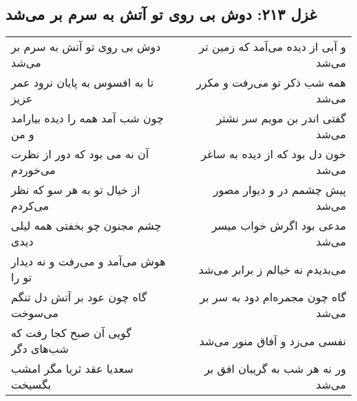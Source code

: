 \begin{center}
\section*{غزل ۲۱۳: دوش بی روی تو آتش به سرم بر می‌شد}
\label{sec:213}
\begin{longtable}{l p{0.5cm} r}
دوش بی روی تو آتش به سرم بر می‌شد
&&
و آبی از دیده می‌آمد که زمین تر می‌شد
\\
تا به افسوس به پایان نرود عمر عزیز
&&
همه شب ذکر تو می‌رفت و مکرر می‌شد
\\
چون شب آمد همه را دیده بیارامد و من
&&
گفتی اندر بن مویم سر نشتر می‌شد
\\
آن نه می بود که دور از نظرت می‌خوردم
&&
خون دل بود که از دیده به ساغر می‌شد
\\
از خیال تو به هر سو که نظر می‌کردم
&&
پیش چشمم در و دیوار مصور می‌شد
\\
چشم مجنون چو بخفتی همه لیلی دیدی
&&
مدعی بود اگرش خواب میسر می‌شد
\\
هوش می‌آمد و می‌رفت و نه دیدار تو را
&&
می‌بدیدم نه خیالم ز برابر می‌شد
\\
گاه چون عود بر آتش دل تنگم می‌سوخت
&&
گاه چون مجمره‌ام دود به سر بر می‌شد
\\
گویی آن صبح کجا رفت که شب‌های دگر
&&
نفسی می‌زد و آفاق منور می‌شد
\\
سعدیا عقد ثریا مگر امشب بگسیخت
&&
ور نه هر شب به گریبان افق بر می‌شد
\\
\end{longtable}
\end{center}
